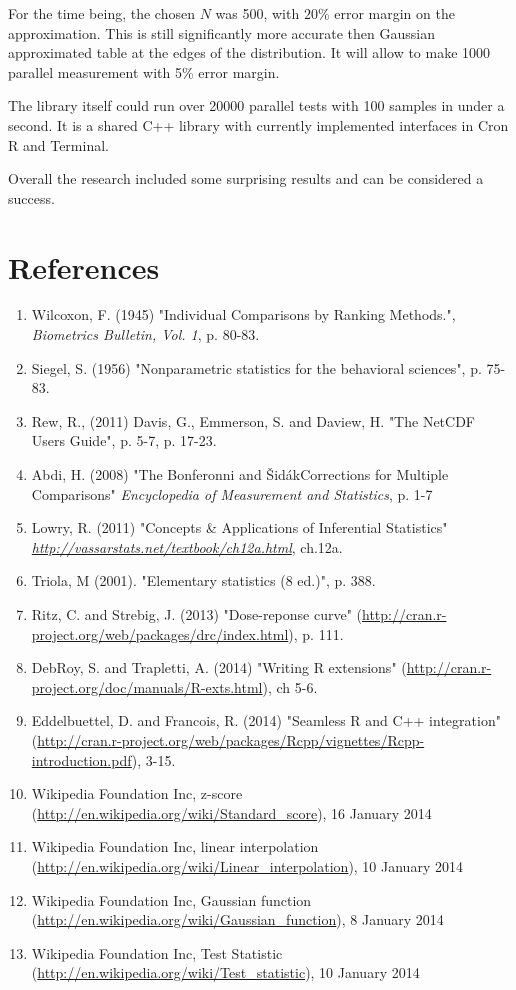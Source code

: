 \documentclass[12pt]{article}
\begin{document}
For the time being, the chosen $N$ was 500, with $20\%$ error margin on the approximation. This is still significantly more accurate then Gaussian approximated table at the edges of the distribution. It will allow to make 1000 parallel measurement with 5\% error margin.

The library itself could run over 20000 parallel tests with 100 samples in under a second. It is a shared C++ library with currently implemented interfaces in Cron R and Terminal.

Overall the research included some surprising results and can be considered a success.

\newpage

\section{References}
\begin{enumerate}
\item Wilcoxon, F. (1945) "Individual Comparisons by Ranking Methods.", \textit{Biometrics Bulletin, Vol. 1}, p. 80-83.
\item Siegel, S. (1956) "Nonparametric statistics for the behavioral sciences", p. 75-83.
\item Rew, R., (2011) Davis, G., Emmerson, S. and Daview, H. "The NetCDF Users Guide", p. 5-7, p. 17-23.
\item Abdi, H. (2008) "The Bonferonni and ŠidákCorrections for Multiple Comparisons" \textit{Encyclopedia of Measurement and Statistics}, p. 1-7
\item Lowry, R. (2011) "Concepts \& Applications of Inferential Statistics" \textit{\url{http://vassarstats.net/textbook/ch12a.html}}, ch.12a.
\item Triola, M (2001). "Elementary statistics (8 ed.)", p. 388.
\item Ritz, C. and Strebig, J. (2013) "Dose-reponse curve" (\url{http://cran.r-project.org/web/packages/drc/index.html}), p. 111.
\item DebRoy, S. and Trapletti, A. (2014) "Writing R extensions" (\url{http://cran.r-project.org/doc/manuals/R-exts.html}), ch 5-6.
\item Eddelbuettel, D. and Francois, R. (2014) "Seamless R and C++ integration" (\url{http://cran.r-project.org/web/packages/Rcpp/vignettes/Rcpp-introduction.pdf}), 3-15.
\item Wikipedia Foundation Inc, z-score (\url{http://en.wikipedia.org/wiki/Standard_score}), 16 January 2014
\item Wikipedia Foundation Inc, linear interpolation (\url{http://en.wikipedia.org/wiki/Linear_interpolation}), 10 January 2014
\item Wikipedia Foundation Inc, Gaussian function (\url{http://en.wikipedia.org/wiki/Gaussian_function}), 8 January 2014
\item Wikipedia Foundation Inc, Test Statistic (\url{http://en.wikipedia.org/wiki/Test_statistic}), 10 January 2014
\end{enumerate}
\end{document}
